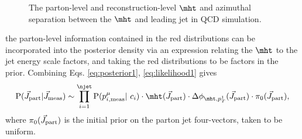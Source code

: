 \begin{figure}[h]
\centering
{}
\caption{The parton-level and reconstruction-level $\mht$ and azimuthal separation between the $\mht$ and leading jet in QCD simulation.}
\label{fig:Mht}
\end{figure}
the parton-level information contained in the red distributions can be incorporated into the posterior density via an expression relating the $\mht$ to the jet energy scale factors, and taking the red distributions to be factors in the prior. Combining Eqs. \ref{eq:posterior1}, \ref{eq:likelihood1} gives
\begin{equation}
{\rm P}(\vec{J}_{\rm part}|\vec{J}_{\rm meas}) \sim
\prod_{i=1}^{\njet}{\rm P}(p^{\mu}_{i,\rm meas}|\ c_{i})\cdot \mht(\vec{J}_{\rm part})\cdot \Delta\phi_{\mht,p_{T}^1}(\vec{J}_{\rm part})\cdot \pi_0(\vec{J}_{\rm part}),
\end{equation}
where $\pi_0(\vec{J}_{\rm part})$ is the initial prior on the parton jet four-vectors, taken to be uniform.


